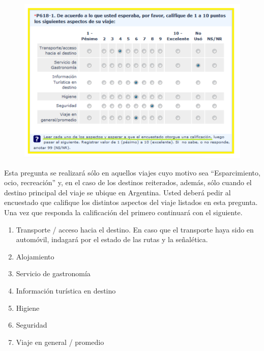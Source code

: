 \documentclass[
  openany]{book}
\providecommand{\tightlist}{%
  \setlength{\itemsep}{0pt}\setlength{\parskip}{0pt}}
\begin{document}
\begin{figure}

{\centering \includegraphics[width=1\linewidth]{imagenes/figura6-116} 

}

\end{figure}

Esta pregunta se realizará sólo en aquellos viajes cuyo motivo sea ``Esparcimiento, ocio, recreación'' y, en el caso de los destinos reiterados, además, sólo cuando el destino principal del viaje se ubique en Argentina. Usted deberá pedir al encuestado que califique los distintos aspectos del viaje listados en esta pregunta. Una vez que responda la calificación del primero continuará con el siguiente.

\begin{enumerate}
\def\labelenumi{\arabic{enumi}.}
\tightlist
\item
  Transporte / acceso hacia el destino. En caso que el transporte haya sido en automóvil, indagará por el estado de las rutas y la señalética.
\item
  Alojamiento
\item
  Servicio de gastronomía
\item
  Información turística en destino
\item
  Higiene
\item
  Seguridad
\item
  Viaje en general / promedio
\end{enumerate}
\end{document}
